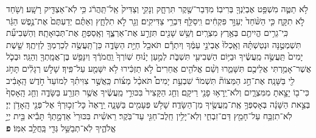 \documentclass[twoside, openany, parskip=half, 11pt]{book}
\begin{document}
\begin{footnotesize}
\begin{multicols}{2}
 לֹ֥א תַטֶּ֛ה מִשְׁפַּ֥ט אֶבְיֹֽנְךָ֖ בְּרִיבֽוֹ׃ מִדְּבַר־שֶׁ֖קֶר תִּרְחָ֑ק וְנָקִ֤י וְצַדִּיק֙ אַֽל־תַּֽהֲרֹ֔ג כִּ֥י לֹֽא־אַצְדִּ֖יק רָשָֽׁע׃ וְשֹׁ֖חַד לֹ֣א תִקָּ֑ח כִּ֤י הַשֹּׁ֨חַד֙ יְעַוֵּ֣ר פִּקְחִ֔ים וִֽיסַלֵּ֖ף דִּבְרֵ֥י צַדִּיקִֽים׃ וְגֵ֖ר לֹ֣א תִלְחָ֑ץ וְאַתֶּ֗ם יְדַעְתֶּם֙ אֶת־נֶ֣פֶשׁ הַגֵּ֔ר כִּֽי־גֵרִ֥ים הֱיִיתֶ֖ם בְּאֶ֥רֶץ מִצְרָֽיִם׃ וְשֵׁ֥שׁ שָׁנִ֖ים תִּזְרַ֣ע אֶת־אַרְצֶ֑ךָ וְאָֽסַפְתָּ֖ אֶת־תְּבֽוּאָתָֽהּ׃ וְהַשְּׁבִיעִ֞ת תִּשְׁמְטֶ֣נָּה וּנְטַשְׁתָּ֗הּ וְאָֽכְלוּ֙ אֶבְיֹנֵ֣י עַמֶּ֔ךָ וְיִתְרָ֕ם תֹּאכַ֖ל חַיַּ֣ת הַשָּׂדֶ֑ה כֵּן־תַּֽעֲשֶׂ֥ה לְכַרְמְךָ֖ לְזֵיתֶֽךָ׃ שֵׁ֤שֶׁת יָמִים֙ תַּֽעֲשֶׂ֣ה מַֽעֲשֶׂ֔יךָ וּבַיּ֥וֹם הַשְּׁבִיעִ֖י תִּשְׁבֹּ֑ת לְמַ֣עַן יָנ֗וּחַ שֽׁוֹרְךָ֙ וַֽחֲמֹרֶ֔ךָ וְיִנָּפֵ֥שׁ בֶּן־אֲמָֽתְךָ֖ וְהַגֵּֽר׃ וּבְכֹ֛ל אֲשֶׁר־אָמַ֥רְתִּי אֲלֵיכֶ֖ם תִּשָּׁמֵ֑רוּ וְשֵׁ֨ם אֱלֹהִ֤ים אֲחֵרִים֙ לֹ֣א תַזְכִּ֔ירוּ לֹ֥א יִשָּׁמַ֖ע עַל־פִּֽיךָ׃ שָׁלֹ֣שׁ רְגָלִ֔ים תָּחֹ֥ג לִ֖י בַּשָּׁנָֽה׃ אֶת־חַ֣ג הַמַּצּוֹת֘ תִּשְׁמֹר֒ שִׁבְעַ֣ת יָמִים֩ תֹּאכַ֨ל מַצּ֜וֹת כַּֽאֲשֶׁ֣ר צִוִּיתִ֗ךָ לְמוֹעֵד֙ חֹ֣דֶשׁ הָֽאָבִ֔יב כִּי־ב֖וֹ יָצָ֣אתָ מִמִּצְרָ֑יִם וְלֹא־יֵֽרָא֥וּ פָנַ֖י רֵיקָֽם׃ וְחַ֤ג הַקָּצִיר֙ בִּכּוּרֵ֣י מַֽעֲשֶׂ֔יךָ אֲשֶׁ֥ר תִּזְרַ֖ע בַּשָּׂדֶ֑ה וְחַ֤ג הָֽאָסִף֙ בְּצֵ֣את הַשָּׁנָ֔ה בְּאָסְפְּךָ֥ אֶֽת־מַֽעֲשֶׂ֖יךָ מִן־הַשָּׂדֶֽה׃ שָׁלֹ֥שׁ פְּעָמִ֖ים בַּשָּׁנָ֑ה יֵֽרָאֶה֙ כָּל־זְכ֣וּרְךָ֔ אֶל־פְּנֵ֖י הָֽאָדֹ֥ן יְיָ׃ לֹֽא־תִזְבַּ֥ח עַל־חָמֵ֖ץ דַּם־זִבְחִ֑י וְלֹֽא־יָלִ֥ין חֵֽלֶב־חַגִּ֖י עַד־בֹּֽקֶר׃ רֵאשִׁ֗ית בִּכּוּרֵי֙ אַדְמָ֣תְךָ֔ תָּבִ֕יא בֵּ֖ית יְיָ֣ אֱלֹהֶ֑יךָ לֹֽא־תְבַשֵּׁ֥ל גְּדִ֖י בַּֽחֲלֵ֥ב אִמּֽוֹ׃ \textbf{פ} 



\end{multicols}
\end{footnotesize}
\end{document}
